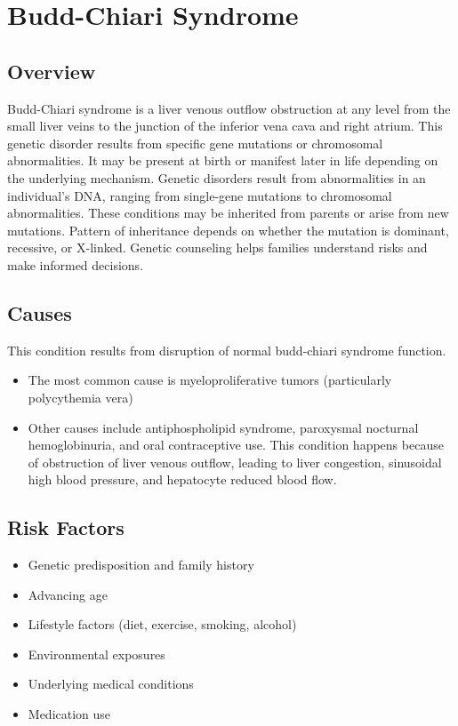 \chapter{Budd-Chiari Syndrome}
\label{sec:Budd-Chiari Syndrome}

\section{Overview}
Budd-Chiari syndrome is a liver venous outflow obstruction at any level from the small liver veins to the junction of the inferior vena cava and right atrium. This genetic disorder results from specific gene mutations or chromosomal abnormalities. It may be present at birth or manifest later in life depending on the underlying mechanism. Genetic disorders result from abnormalities in an individual's DNA, ranging from single-gene mutations to chromosomal abnormalities. These conditions may be inherited from parents or arise from new mutations. Pattern of inheritance depends on whether the mutation is dominant, recessive, or X-linked. Genetic counseling helps families understand risks and make informed decisions.
\section{Causes}
This condition results from disruption of normal budd-chiari syndrome function.

\begin{itemize}[noitemsep]
  \item The most common cause is myeloproliferative tumors (particularly polycythemia vera)
  \item Other causes include antiphospholipid syndrome, paroxysmal nocturnal hemoglobinuria, and oral contraceptive use. This condition happens because of obstruction of liver venous outflow, leading to liver congestion, sinusoidal high blood pressure, and hepatocyte reduced blood flow.
\end{itemize}
\section{Risk Factors}


\begin{itemize}[noitemsep]
  \item Genetic predisposition and family history
  \item Advancing age
  \item Lifestyle factors (diet, exercise, smoking, alcohol)
  \item Environmental exposures
  \item Underlying medical conditions
  \item Medication use
\end{itemize}
